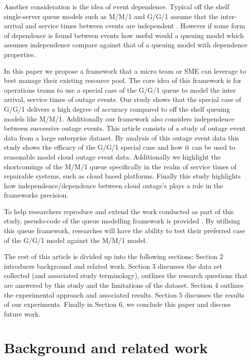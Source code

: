 \documentclass[5p]{elsarticle}
\begin{document}
Another consideration is the idea of event dependence. Typical off the shelf single-server queue models such as M/M/1 and G/G/1 assume that the inter-arrival and service times between events are independent \cite{MM1}. However if some form of dependence is found between events how useful would a queuing model which assumes independence compare against that of a queuing model with dependence properties.

In this paper we propose a framework that a micro team or SME can leverage to best manage their existing resource pool. The core idea of this framework is for operations teams to use a special case of the G/G/1 queue to model the inter arrival, service times of outage events. Our study shows that the special case of G/G/1 delivers a high degree of accuracy compared to off the shelf queuing models like M/M/1. Additionally our framework also considers independence between successive outage events. This article consists of a study of outage event data from a large enterprise dataset. By analysis of this outage event data this study shows the efficacy of the G/G/1 special case and how it can be used to reasonable model cloud outage event data. Additionally we highlight the shortcomings of the M/M/1 queue specifically in the realm of service times of repairable systems, such as cloud based platforms. Finally this study highlights how independence/dependence between cloud outage's plays a role in the frameworks precision.

To help researchers reproduce and extend the work conducted as part of this study, pseudo-code of the queue modelling framework is provided . By utilising this queue framework, researches will have the ability to test their preferred case of the G/G/1 model against the M/M/1 model.

The rest of this article is divided up into the following sections: Section 2 introduces background and related work. Section 3 discusses the data set collected (and associated study terminology), outlines the research questions that are answered by this study and the limitations of the dataset. Section 4 outlines the experimental approach and associated results. Section 5 discusses the results of our experiments. Finally in Section 6, we conclude this paper and discuss future work.

\section{Background and related work}
\end{document}
